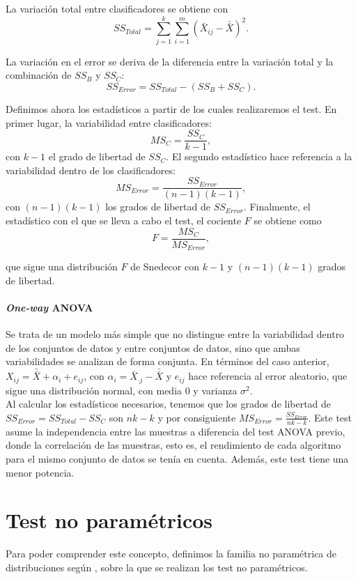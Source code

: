 	La variación total entre clasificadores se obtiene con
	\[
		SS_{Total} =  
			\sum\limits_{j=1}^k
				\sum\limits_{i=1}^m
					\left( \bar{X}_{ij} - 
						   \bar{\bar{X}} \right)^2.
	\]
			
	La variación en el error se deriva de la diferencia entre 
la variación total y la combinación de $SS_B$ y $SS_C$:
	\[
		SS_{Error} = SS_{Total} - (SS_B + SS_C).
	\]
	
	Definimos ahora los estadísticos a partir de los cuales 
realizaremos el test. En primer lugar, la variabilidad entre
clasificadores:
	\[
		MS_C = \frac{SS_C}{k-1},
	\]
	con $k-1$ el grado de libertad de $SS_C$. El segundo 
estadístico hace referencia a la variabilidad dentro de los 
clasificadores:
	\[
		MS_{Error} = \frac{SS_{Error}}{(n-1)(k-1)},
	\]
	con $(n-1)(k-1)$ los grados de libertad de $SS_{Error}$.
Finalmente, el estadístico con el que se lleva a cabo el
test, el cociente $F$ se obtiene como
	\[
		F = \frac{MS_C}{MS_{Error}},
	\]
	
	que sigue una distribución $F$ de Snedecor con $k-1$ y
$(n-1)(k-1)$ grados de libertad.

\paragraph{\textit{One-way} ANOVA} Se trata de un modelo más 
simple que no distingue entre la variabilidad dentro de los
conjuntos de datos y entre conjuntos de datos, sino que ambas
variabilidades se analizan de forma conjunta. En términos del
caso anterior, $X_{ij} = \bar{\bar{X}} + \alpha_i + e_{ij}$, 
con $\alpha_i = \bar{X}_{\cdot j} - \bar{\bar{X}}$ y $e_{ij}$
hace referencia al error aleatorio, que sigue una 
distribución normal, con media $0$ y varianza $\sigma^2$. \\
	Al calcular los estadísticos necesarios, tenemos que los 
grados de libertad de $SS_{Error} = SS_{Total} - SS_{C}$ son 
$nk-k$ y por consiguiente $MS_{Error} = \frac{SS_{Error}}
{nk-k}$. Este test asume la independencia entre las muestras
a diferencia del test ANOVA previo, donde la correlación de 
las muestras, esto es, el rendimiento de cada algoritmo para
el mismo conjunto de datos se tenía en cuenta. Además, este
test tiene una menor potencia.
	

\section{Test no paramétricos}

	Para poder comprender este concepto, definimos la familia 
no paramétrica de distribuciones según \cite{PESSAL10}, sobre 
la que se realizan los test no paramétricos. 
 
